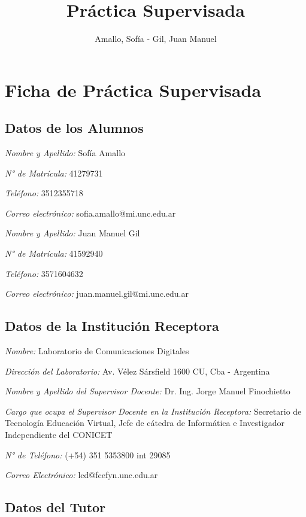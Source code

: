 \documentclass[12pt]{article}
\title{\huge Práctica Supervisada\vspace*{5cm}}
\author{Amallo, Sofía - Gil, Juan Manuel}
\date{\parbox{\linewidth}{\centering%
  Noviembre 18, 2022 \endgraf\bigskip
  \vspace*{4cm}
  Dr. Ing. Horacio A. Mendoza \hspace*{1cm} Dr. Ing. Jorge Finochietto\endgraf\medskip
  \vspace*{0.5cm}
  Laboratorio de\ Comunicaciones Digitales \endgraf
  Universidad Nacional de Córdoba}}
\begin{document}
\maketitle
\thispagestyle{empty}
\newpage

\pagestyle{myheadings}
\markright{}

\section{Ficha de Práctica Supervisada}
\subsection{Datos de los Alumnos}
\raggedright
\textsl{Nombre y Apellido:}  Sofía Amallo

\textsl{N° de Matrícula:} 41279731

\textsl{Teléfono:} 3512355718

\textsl{Correo electrónico:} sofia.amallo@mi.unc.edu.ar
\vspace*{0.5cm}

\textsl{Nombre y Apellido:} Juan Manuel Gil

\textsl{N° de Matrícula:} 41592940

\textsl{Teléfono:} 3571604632

\textsl{Correo electrónico:} juan.manuel.gil@mi.unc.edu.ar

\subsection{Datos de la Institución Receptora}
\textsl{Nombre:} Laboratorio de Comunicaciones Digitales

\textsl{Dirección del Laboratorio:} Av. Vélez Sársfield 1600 CU, Cba - Argentina

\textsl{Nombre y Apellido del Supervisor Docente:} Dr. Ing. Jorge Manuel Finochietto

\textsl{Cargo que ocupa el Supervisor Docente en la Institución Receptora:} Secretario de Tecnología  Educación Virtual, Jefe de cátedra de Informática e Investigador Independiente del CONICET

\textsl{N° de Teléfono:} (+54) 351 5353800 int 29085

\textsl{Correo Electrónico:} lcd@fcefyn.unc.edu.ar

\subsection{Datos del Tutor}
\end{document}
